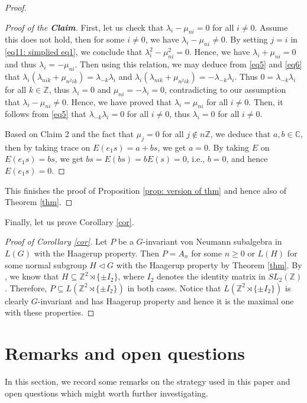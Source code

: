 \documentclass[12pt]{amsart}
\theoremstyle{definition}
\theoremstyle{remark}
\begin{document}
\begin{proof}
\begin{proof}[Proof of the \textbf{Claim}]
First, let us check that $\lambda_i-\mu_{ni}=0$ for all $i\neq 0$. Assume this does not hold, then for some $i\neq 0$, we have $\lambda_i-\mu_{ni}\neq 0$. By setting $j=i$ in \eqref{eq11: simplied eq1}, we conclude that $\lambda_i^2-\mu_{ni}^2=0$. Hence, we have $\lambda_i+\mu_{ni}=0$ and thus $\lambda_i=-\mu_{ni}$. Then using this relation, we may deduce from \eqref{eq5} and \eqref{eq6} that
$\lambda_i(\lambda_{nik}+\mu_{n^2ik})=\lambda_{-k}\lambda_i$ and $\lambda_i(\lambda_{nik}+\mu_{n^2ik})=-\lambda_{-k}\lambda_i$. Thus
$0=\lambda_{-k}\lambda_i$ for all $k\in\mathbb{Z}$, thus $\lambda_i=0$ and $\mu_{ni}=-\lambda_i=0$, contradicting to our assumption that $\lambda_i-\mu_{ni}\neq 0$. Hence, we have proved that $\lambda_i=\mu_{ni}$ for all $i\neq 0$. Then, it follows from \eqref{eq5} that $\lambda_{-k}\lambda_i=0$ for all $i\neq 0$, thus $\lambda_i=0$ for all $i\neq 0$.

Based on Claim 2 and the fact that $\mu_j=0$ for all $j\not\in n\mathbb{Z}$, we deduce that $a, b\in\mathbb{C}$, then by taking trace on $E(e_1s)=a+bs$, we get $a=0$. By taking $E$ on $E(e_1s)=bs$, we get $bs=E(bs)=bE(s)=0$, i.e., $b=0$, and hence $E(e_1s)=0$. 
\end{proof}
This finishes the proof of Proposition \ref{prop: version of thm} and hence also of Theorem \ref{thm}.
\end{proof}

Finally, let us prove Corollary \ref{cor}.
\begin{proof}[Proof of Corollary \ref{cor}]
Let $P$ be a $G$-invariant von Neumann subalgebra in $L(G)$ with the Haagerup property. Then $P=A_n$ for some $n\geq 0$ or $L(H)$ for some normal subgroup $H\lhd G$ with the Haagerup property by Theorem \ref{thm}. By \cite[Proposition 2.10]{jiangskalski}, we know that $H\subseteq \mathbb{Z}^2\rtimes \{\pm I_2\}$, where $I_2$ denotes the identity matrix in $SL_2(\mathbb{Z})$. Therefore, $P\subseteq L(\mathbb{Z}^2\rtimes \{\pm I_2\})$ in both cases.
Notice that $L(\mathbb{Z}^2\rtimes \{\pm I_2\})$ is clearly $G$-invariant and has Haagerup property and hence it is the maximal one with these properties.
\end{proof}




\section{Remarks and open questions}\label{section: last remark}

In this section, we record some remarks on the strategy used in this paper and open questions which might worth further investigating.
\end{document}
